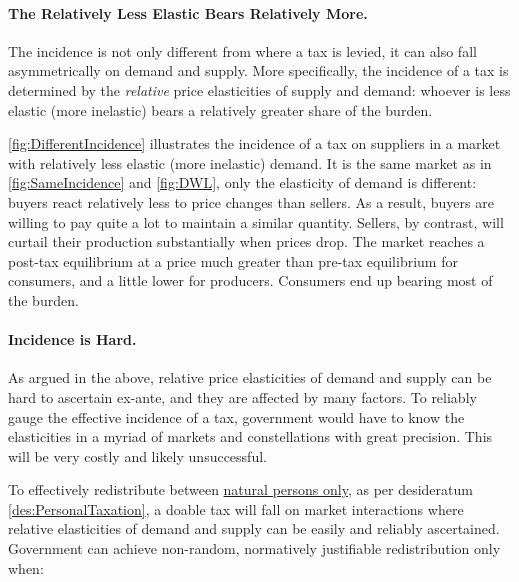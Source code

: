 \paragraph{The Relatively Less Elastic Bears Relatively More.} The incidence is not only different from where a tax is levied, it can also fall asymmetrically on demand and supply. More specifically, the incidence of a tax is determined by the \emph{relative} price elasticities of supply and demand: whoever is less elastic (more inelastic) bears a relatively greater share of the burden.

\autoref{fig:DifferentIncidence} illustrates the incidence of a tax on suppliers in a market with relatively less elastic (more inelastic) demand. It is the same market as in \autoref{fig:SameIncidence} and \ref{fig:DWL}, only the elasticity of demand is different: buyers react relatively less to price changes than sellers. As a result, buyers are willing to pay quite a lot to maintain a similar quantity. Sellers, by contrast, will curtail their production substantially when prices drop. The market reaches a post-tax equilibrium at a price much greater than pre-tax equilibrium for consumers, and a little lower for producers. Consumers end up bearing most of the burden.



\paragraph{Incidence is Hard.} As argued in the above, relative price elasticities of demand and supply can be hard to ascertain ex-ante, and they are affected by many factors. To reliably gauge the effective incidence of a tax, government would have to know the elasticities in a myriad of markets and constellations with great precision. This will be very costly and likely unsuccessful.


To effectively redistribute between \href{des:PersonalTaxation}{natural persons only}, as per desideratum \ref{des:PersonalTaxation}, a doable tax will fall on market interactions where relative elasticities of demand and supply can be easily and reliably ascertained. Government can achieve non-random, normatively justifiable redistribution only when:

